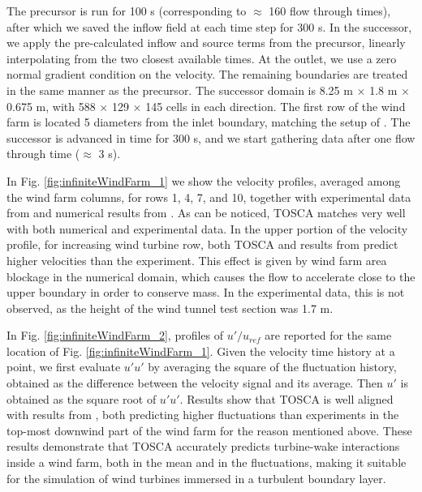 \documentclass[journal abbreviation, manuscript]{copernicus}
\begin{document}
The precursor is run for 100 s (corresponding to $\approx$ 160 flow through times), after which we saved the inflow field at each time step for 300 s. In the successor, we apply the pre-calculated inflow and source terms from the precursor, linearly interpolating from the two closest available times. At the outlet, we use a zero normal gradient condition on the velocity. The remaining boundaries are treated in the same manner as the precursor. The successor domain is 8.25 m $\times$ 1.8 m $\times$ 0.675 m, with  588 $\times$ 129 $\times$ 145 cells in each direction. The first row of the wind farm is located 5 diameters from the inlet boundary, matching the setup of \cite{2018_StevensEtAl}. The successor is advanced in time for 300 s, and we start gathering data after one flow through time ($\approx$ 3 s). 

In Fig. \ref{fig:infiniteWindFarm_1} we show the velocity profiles, averaged among the wind farm columns, for rows 1, 4, 7, and 10, together with experimental data from \cite{2011_ChamorroPortéAgel} and numerical results from \cite{2018_StevensEtAl}. As can be noticed, TOSCA matches very well with both numerical and experimental data. In the upper portion of the velocity profile, for increasing wind turbine row, both TOSCA and results from \cite{2018_StevensEtAl} predict higher velocities than the experiment. This effect is given by wind farm area blockage in the numerical domain, which causes the flow to accelerate close to the upper boundary in order to conserve mass. In the experimental data, this is not observed, as the height of the wind tunnel test section was 1.7 m. 

In Fig. \ref{fig:infiniteWindFarm_2}, profiles of $u'/u_{ref}$ are reported for the same location of Fig. \ref{fig:infiniteWindFarm_1}. Given the velocity time history at a point, we first evaluate $u'u'$ by averaging the square of the fluctuation history, obtained as the difference between the velocity signal and its average. Then $u'$ is obtained as the square root of $u'u'$. Results show that TOSCA is well aligned with results from \cite{2018_StevensEtAl}, both predicting higher fluctuations than experiments in the top-most downwind part of the wind farm for the reason mentioned above. These results demonstrate that TOSCA accurately predicts turbine-wake interactions inside a wind farm, both in the mean and in the fluctuations, making it suitable for the simulation of wind turbines immersed in a turbulent boundary layer. 
  
\end{document}
